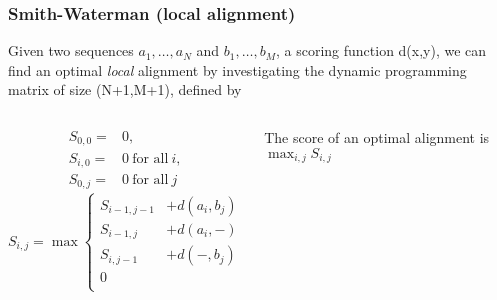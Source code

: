 \documentclass[aspectratio=1610]{beamer}
\begin{document}
\begin{frame}
\frametitle{Smith-Waterman (local alignment)}
Given two sequences $a_1,\ldots,a_N$ and $b_1,\ldots,b_M$, a scoring function d(x,y), we can find an optimal {\em local} alignment by investigating the dynamic programming matrix of size (N+1,M+1), defined by

\begin{columns}


\begin{align*}
 S_{0,0} =& 0, \\
S_{i,0} =& 0 \ \textrm{for all}\ i, \\
S_{0,j} =& 0 \ \textrm{for all}\ j 
\end{align*}
\[ S_{i,j}=\max
\begin{cases}
   S_{i-1,j-1} & + d(a_i,b_j)\\
   S_{i-1,j} & + d(a_i,-)\\
   S_{i,j-1} & + d(-,b_j)\\
   0\\
\end{cases}
\]

The score of an optimal alignment is $\displaystyle \max_{i,j}S_{i,j}$

\begin{overprint}
\vspace{1cm}
\begin{center}
\end{center}


\end{overprint}

\end{columns}

\end{frame}
\end{document}
